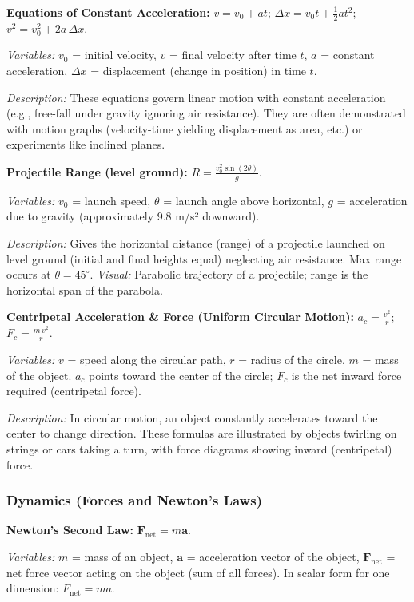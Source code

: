 \documentclass{article}
\begin{document}
\textbf{Equations of Constant Acceleration:} $v = v_0 + a t$; $\displaystyle \Delta x = v_0 t + \tfrac{1}{2}a t^2$; $v^2 = v_0^2 + 2a\,\Delta x$.

\textit{Variables:} $v_0$ = initial velocity, $v$ = final velocity after time $t$, $a$ = constant acceleration, $\Delta x$ = displacement (change in position) in time $t$.

\textit{Description:} These equations govern linear motion with constant acceleration (e.g., free-fall under gravity ignoring air resistance). They are often demonstrated with motion graphs (velocity-time yielding displacement as area, etc.) or experiments like inclined planes.

\textbf{Projectile Range (level ground):} $R = \frac{v_0^2 \sin(2\theta)}{g}$.

\textit{Variables:} $v_0$ = launch speed, $\theta$ = launch angle above horizontal, $g$ = acceleration due to gravity (approximately 9.8 m/s² downward).

\textit{Description:} Gives the horizontal distance (range) of a projectile launched on level ground (initial and final heights equal) neglecting air resistance. Max range occurs at $\theta=45^\circ$. \textit{Visual:} Parabolic trajectory of a projectile; range is the horizontal span of the parabola.

\textbf{Centripetal Acceleration \& Force (Uniform Circular Motion):} $a_c = \frac{v^2}{r}$;  $F_c = \frac{m\,v^2}{r}$.

\textit{Variables:} $v$ = speed along the circular path, $r$ = radius of the circle, $m$ = mass of the object. $a_c$ points toward the center of the circle; $F_c$ is the net inward force required (centripetal force).

\textit{Description:} In circular motion, an object constantly accelerates toward the center to change direction. These formulas are illustrated by objects twirling on strings or cars taking a turn, with force diagrams showing inward (centripetal) force.

\subsubsection*{Dynamics (Forces and Newton's Laws)}

\textbf{Newton’s Second Law:} $\mathbf{F}_{\text{net}} = m \mathbf{a}$.

\textit{Variables:} $m$ = mass of an object, $\mathbf{a}$ = acceleration vector of the object, $\mathbf{F}_{\text{net}}$ = net force vector acting on the object (sum of all forces). In scalar form for one dimension: $F_{\text{net}} = m a$.
\end{document}
